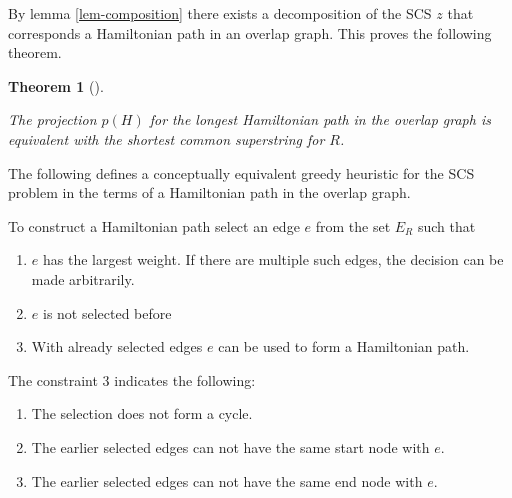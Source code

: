 \documentclass[english,twoside,censored,csm,algorithms-track-2020]{HYthesisML}
\theoremstyle{plain}
\newtheorem{theorem}{Theorem}[chapter]
\theoremstyle{definition}
\begin{document}
By lemma \ref{lem-composition} there exists a decomposition of the SCS $z$ that corresponds a
Hamiltonian path in an overlap graph. This proves the following theorem.




\begin{theorem} [] ~\label{lem-similarity-between-SCS-Hamp}

  The projection $p(H)$ for the longest Hamiltonian path in the overlap graph is equivalent with
  the shortest common superstring for $R$.

\end{theorem}

The following defines a conceptually equivalent greedy heuristic for the SCS problem in the terms of
a Hamiltonian path in the overlap graph.

To  construct a Hamiltonian path select an edge $e$ from the set $E_R$ such that
\begin{enumerate}
\item $e$ has the largest weight. If there are multiple such edges, the decision can be made arbitrarily.
\item $e$ is not selected before
\item With already selected edges $e$ can be used to form a Hamiltonian path.
\end{enumerate}
The constraint 3 indicates the following:
\begin{enumerate}[i]
\item The selection does not form a cycle.
\item The earlier selected edges can not have the same start node with $e$.
\item The earlier selected edges can not have the same end node with $e$.
\end{enumerate}




\end{document}
